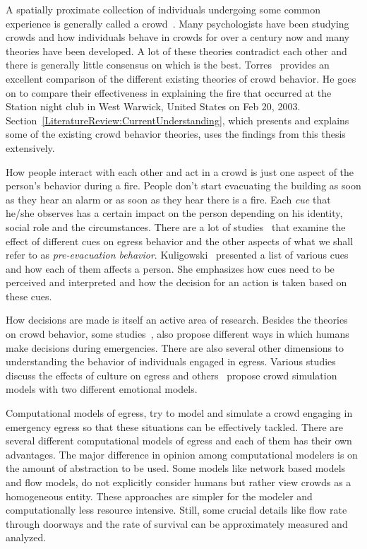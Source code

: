 A spatially proximate collection of individuals undergoing some common experience is generally called a crowd~\cite{Aveni:1997wq}. Many psychologists have been studying crowds and how individuals behave in crowds for over a century now and many theories have been developed. A lot of these theories contradict each other and there is generally little consensus on which is the best. Torres~\cite{Torres:2010tj} provides an excellent comparison of the different existing theories of crowd behavior. He goes on to compare their effectiveness in explaining the fire that occurred at the Station night club in West Warwick, United States on Feb 20, 2003. Section~\ref{LiteratureReview:CurrentUnderstanding}, which presents and explains some of the existing crowd behavior theories, uses the findings from this thesis extensively.

How people interact with each other and act in a crowd is just one aspect of the person's behavior during a fire. People don't start evacuating the building as soon as they hear an alarm or as soon as they hear there is a fire. Each \emph{cue} that he/she observes has a certain impact on the person depending on his identity, social role and the circumstances. There are a lot of studies~\cite{Kuligowski:2009un,Ozel:2001tn,Torres:2010tj,Pires:2005gs,Sime:1983uy} that examine the effect of different cues on egress behavior and the other aspects of what we shall refer to as \emph{pre-evacuation behavior}. Kuligowski~\cite{Kuligowski:2009un} presented a list of various cues and how each of them affects a person. She emphasizes how cues need to be perceived and interpreted and how the decision for an action is taken based on these cues.

How decisions are made is itself an active area of research. Besides the theories on crowd behavior, some studies~\cite{Pires:2005gs, Ozel:2001tn}, also propose different ways in which humans make decisions during emergencies. There are also several other dimensions to understanding the behavior of individuals engaged in egress. Various studies~\cite{Andree:2008td,Sandberg:1997tw,Kobes:2009jx} discuss the effects of culture on egress and others~\cite{Pelechano:2005vp,Aydt:2011wz} propose crowd simulation models with two different emotional models.

Computational models of egress, try to model and simulate a crowd engaging in emergency egress so that these situations can be effectively tackled. There are several different computational models of egress and each of them has their own advantages. The major difference in opinion among computational modelers is on the amount of abstraction to be used. Some models like network based models and flow models, do not explicitly consider humans but rather view crowds as a homogeneous entity. These approaches are simpler for the modeler and computationally less resource intensive. Still, some crucial details like flow rate through doorways and the rate of survival can be approximately measured and analyzed.

